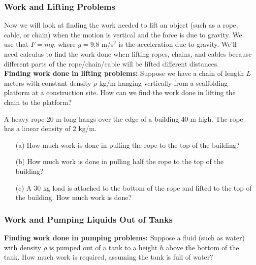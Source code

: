 \documentclass[12pt]{article}
\begin{document}
\vspace{100mm}

\subsubsection*{Work and Lifting Problems}

Now we will look at finding the work needed to lift an object (such as a rope, cable, or chain) when the motion is vertical and the force is due to gravity. We use that $F=mg$, where $g=9.8$ m/s$^2$ is the acceleration due to gravity. We'll need calculus to find the work done when lifting ropes, chains, and cables because different parts of the rope/chain/cable will be lifted different distances.\\

\textbf{Finding work done in lifting problems:} Suppose we have a chain of length $L$ meters with constant density $\rho$ kg/m hanging vertically from a scaffolding platform at a construction site. How can we find the work done in lifting the chain to the platform?

\newpage 

\Example A heavy rope 20 m long hangs over the edge of a building 40 m high. The rope has a linear density of 2 kg/m.

\begin{itemize}

\item[(a)] How much work is done in pulling the rope to the top of the building?

\vfill

\item[(b)] How much work is done in pulling half the rope to the top of the building?

\vfill 

\item[(c)] A 30 kg load is attached to the bottom of the rope and lifted to the top of the building. How much work is done?

\vfill 

\end{itemize}

\newpage

\subsubsection*{Work and Pumping Liquids Out of Tanks}

\textbf{Finding work done in pumping problems:} Suppose a fluid (such as water) with density $\rho$ is pumped out of a tank to a height $h$ above the bottom of the tank. How much work is required, assuming the tank is full of water?
\end{document}
